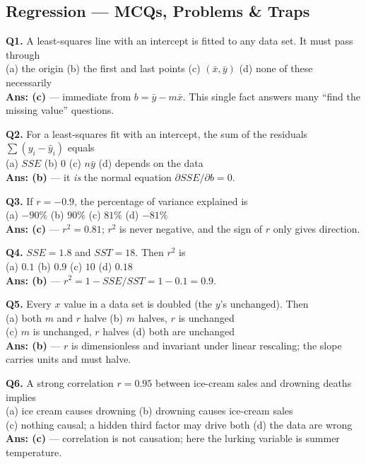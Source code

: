 \subsection{Regression --- MCQs, Problems \& Traps}

\begin{mcqbox}
\textbf{Q1.} A least-squares line with an intercept is fitted to any data set. It must pass through\\
(a) the origin \quad (b) the first and last points \quad (c) $(\bar x,\bar y)$ \quad (d) none of these necessarily\\
\textbf{Ans: (c)} --- immediate from $b = \bar y - m\bar x$. This single fact answers many ``find the missing value'' questions.

\textbf{Q2.} For a least-squares fit with an intercept, the sum of the residuals $\sum(y_i-\hat y_i)$ equals\\
(a) $SSE$ \quad (b) $0$ \quad (c) $n\bar y$ \quad (d) depends on the data\\
\textbf{Ans: (b)} --- it \emph{is} the normal equation $\partial SSE/\partial b = 0$.

\textbf{Q3.} If $r = -0.9$, the percentage of variance explained is\\
(a) $-90\%$ \quad (b) $90\%$ \quad (c) $81\%$ \quad (d) $-81\%$\\
\textbf{Ans: (c)} --- $r^2 = 0.81$; $r^2$ is never negative, and the sign of $r$ only gives direction.

\textbf{Q4.} $SSE = 1.8$ and $SST = 18$. Then $r^2$ is\\
(a) $0.1$ \quad (b) $0.9$ \quad (c) $10$ \quad (d) $0.18$\\
\textbf{Ans: (b)} --- $r^2 = 1-SSE/SST = 1-0.1 = 0.9$.

\textbf{Q5.} Every $x$ value in a data set is doubled (the $y$'s unchanged). Then\\
(a) both $m$ and $r$ halve \quad (b) $m$ halves, $r$ is unchanged\\
(c) $m$ is unchanged, $r$ halves \quad (d) both are unchanged\\
\textbf{Ans: (b)} --- $r$ is dimensionless and invariant under linear rescaling; the slope carries units and must halve.

\textbf{Q6.} A strong correlation $r = 0.95$ between ice-cream sales and drowning deaths implies\\
(a) ice cream causes drowning \quad (b) drowning causes ice-cream sales\\
(c) nothing causal; a hidden third factor may drive both \quad (d) the data are wrong\\
\textbf{Ans: (c)} --- correlation is not causation; here the lurking variable is summer temperature.


\end{mcqbox}
